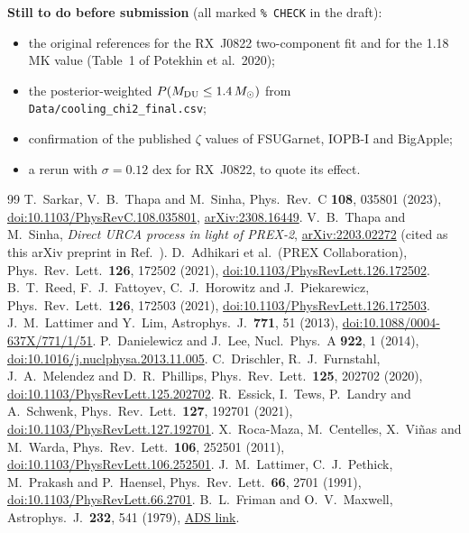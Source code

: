\documentclass[11pt,a4paper]{article}
\newcommand{\Msun}{M_\odot}
\newcommand{\doi}[1]{\href{https://doi.org/#1}{doi:#1}}
\newcommand{\arxiv}[1]{\href{https://arxiv.org/abs/#1}{arXiv:#1}}
\newcommand{\ads}[1]{\href{https://ui.adsabs.harvard.edu/abs/#1}{ADS link}}
\begin{document}
\noindent\textbf{Still to do before submission} (all marked \texttt{\% CHECK} in the draft):
\begin{itemize}
\item the original references for the RX~J0822 two-component fit and for the 1.18 MK value (Table~1 of Potekhin et al.\ 2020);
\item the posterior-weighted $P(M_{\rm DU}\le1.4\,\Msun)$ from \texttt{Data/cooling\_chi2\_final.csv};
\item confirmation of the published $\zeta$ values of FSUGarnet, IOPB-I and BigApple;
\item a rerun with $\sigma=0.12$ dex for RX~J0822, to quote its effect.
\end{itemize}

\begin{thebibliography}{99}
\small
{} T.~Sarkar, V.~B.~Thapa and M.~Sinha, Phys.\ Rev.\ C \textbf{108}, 035801 (2023), \doi{10.1103/PhysRevC.108.035801}, \arxiv{2308.16449}.
 V.~B.~Thapa and M.~Sinha, \emph{Direct URCA process in light of PREX-2}, \arxiv{2203.02272} (cited as this arXiv preprint in Ref.~\cite{Sarkar2023}).
 D.~Adhikari et al.\ (PREX Collaboration), Phys.\ Rev.\ Lett.\ \textbf{126}, 172502 (2021), \doi{10.1103/PhysRevLett.126.172502}.
 B.~T.~Reed, F.~J.~Fattoyev, C.~J.~Horowitz and J.~Piekarewicz, Phys.\ Rev.\ Lett.\ \textbf{126}, 172503 (2021), \doi{10.1103/PhysRevLett.126.172503}.
 J.~M.~Lattimer and Y.~Lim, Astrophys.\ J.\ \textbf{771}, 51 (2013), \doi{10.1088/0004-637X/771/1/51}.
 P.~Danielewicz and J.~Lee, Nucl.\ Phys.\ A \textbf{922}, 1 (2014), \doi{10.1016/j.nuclphysa.2013.11.005}.
 C.~Drischler, R.~J.~Furnstahl, J.~A.~Melendez and D.~R.~Phillips, Phys.\ Rev.\ Lett.\ \textbf{125}, 202702 (2020), \doi{10.1103/PhysRevLett.125.202702}.
 R.~Essick, I.~Tews, P.~Landry and A.~Schwenk, Phys.\ Rev.\ Lett.\ \textbf{127}, 192701 (2021), \doi{10.1103/PhysRevLett.127.192701}.
 X.~Roca-Maza, M.~Centelles, X.~Vi\~nas and M.~Warda, Phys.\ Rev.\ Lett.\ \textbf{106}, 252501 (2011), \doi{10.1103/PhysRevLett.106.252501}.
 J.~M.~Lattimer, C.~J.~Pethick, M.~Prakash and P.~Haensel, Phys.\ Rev.\ Lett.\ \textbf{66}, 2701 (1991), \doi{10.1103/PhysRevLett.66.2701}.
 B.~L.~Friman and O.~V.~Maxwell, Astrophys.\ J.\ \textbf{232}, 541 (1979), \ads{1979ApJ...232..541F}.

\end{thebibliography}
\end{document}
